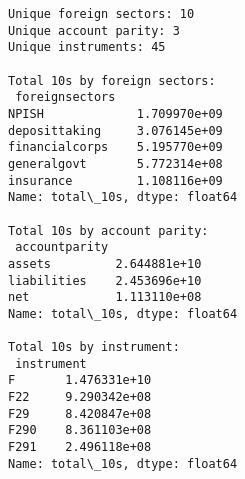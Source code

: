 \documentclass[11pt]{article}
\begin{document}
    \begin{Verbatim}[commandchars=\\\{\}]
Unique foreign sectors: 10
Unique account parity: 3
Unique instruments: 45

Total 10s by foreign sectors:
 foreignsectors
NPISH             1.709970e+09
deposittaking     3.076145e+09
financialcorps    5.195770e+09
generalgovt       5.772314e+08
insurance         1.108116e+09
Name: total\_10s, dtype: float64

Total 10s by account parity:
 accountparity
assets         2.644881e+10
liabilities    2.453696e+10
net            1.113110e+08
Name: total\_10s, dtype: float64

Total 10s by instrument:
 instrument
F       1.476331e+10
F22     9.290342e+08
F29     8.420847e+08
F290    8.361103e+08
F291    2.496118e+08
Name: total\_10s, dtype: float64
    \end{Verbatim}
\end{document}
